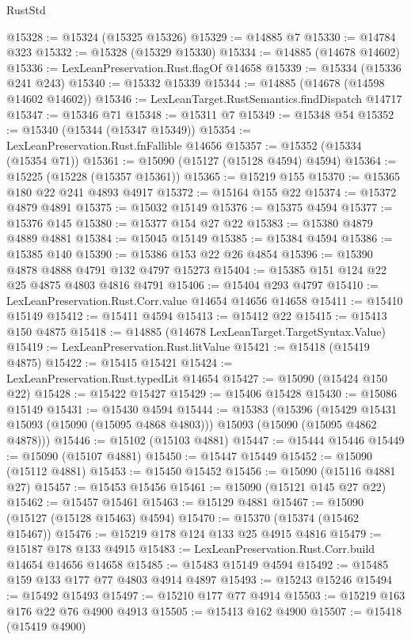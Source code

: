 \begin{lexlean}{RustStd}
\begin{coremodule}
@15328 := @15324 (@15325 @15326)
@15329 := @14885 @7
@15330 := @14784 @323
@15332 := @15328 (@15329 @15330)
@15334 := @14885 (@14678 @14602)
@15336 := LexLeanPreservation.Rust.flagOf @14658
@15339 := @15334 (@15336 @241 @243)
@15340 := @15332 @15339
@15344 := @14885 (@14678 (@14598 @14602 @14602))
@15346 := LexLeanTarget.RustSemantics.findDispatch @14717
@15347 := @15346 @71
@15348 := @15311 @7
@15349 := @15348 @54
@15352 := @15340 (@15344 (@15347 @15349))
@15354 := LexLeanPreservation.Rust.fnFallible @14656
@15357 := @15352 (@15334 (@15354 @71))
@15361 := @15090 (@15127 (@15128 @4594) @4594)
@15364 := @15225 (@15228 (@15357 @15361))
@15365 := @15219 @155
@15370 := @15365 @180 @22 @241 @4893 @4917
@15372 := @15164 @155 @22
@15374 := @15372 @4879 @4891
@15375 := @15032 @15149
@15376 := @15375 @4594
@15377 := @15376 @145
@15380 := @15377 @154 @27 @22
@15383 := @15380 @4879 @4889 @4881
@15384 := @15045 @15149
@15385 := @15384 @4594
@15386 := @15385 @140
@15390 := @15386 @153 @22 @26 @4854
@15396 := @15390 @4878 @4888 @4791 @132 @4797 @15273
@15404 := @15385 @151 @124 @22 @25 @4875 @4803 @4816 @4791
@15406 := @15404 @293 @4797
@15410 := LexLeanPreservation.Rust.Corr.value @14654 @14656 @14658
@15411 := @15410 @15149
@15412 := @15411 @4594
@15413 := @15412 @22
@15415 := @15413 @150 @4875
@15418 := @14885 (@14678 LexLeanTarget.TargetSyntax.Value)
@15419 := LexLeanPreservation.Rust.litValue
@15421 := @15418 (@15419 @4875)
@15422 := @15415 @15421
@15424 := LexLeanPreservation.Rust.typedLit @14654
@15427 := @15090 (@15424 @150 @22)
@15428 := @15422 @15427
@15429 := @15406 @15428
@15430 := @15086 @15149
@15431 := @15430 @4594
@15444 := @15383
    (@15396
      (@15429 @15431 @15093 (@15090 (@15095 @4868 @4803)))
      @15093
      (@15090 (@15095 @4862 @4878)))
@15446 := @15102 (@15103 @4881)
@15447 := @15444 @15446
@15449 := @15090 (@15107 @4881)
@15450 := @15447 @15449
@15452 := @15090 (@15112 @4881)
@15453 := @15450 @15452
@15456 := @15090 (@15116 @4881 @27)
@15457 := @15453 @15456
@15461 := @15090 (@15121 @145 @27 @22)
@15462 := @15457 @15461
@15463 := @15129 @4881
@15467 := @15090 (@15127 (@15128 @15463) @4594)
@15470 := @15370 (@15374 (@15462 @15467))
@15476 := @15219 @178 @124 @133 @25 @4915 @4816
@15479 := @15187 @178 @133 @4915
@15483 := LexLeanPreservation.Rust.Corr.build @14654 @14656 @14658
@15485 := @15483 @15149 @4594
@15492 := @15485 @159 @133 @177 @77 @4803 @4914 @4897
@15493 := @15243 @15246
@15494 := @15492 @15493
@15497 := @15210 @177 @77 @4914
@15503 := @15219 @163 @176 @22 @76 @4900 @4913
@15505 := @15413 @162 @4900
@15507 := @15418 (@15419 @4900)

\end{coremodule}
\end{lexlean}
